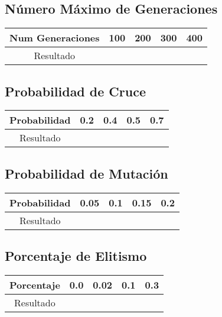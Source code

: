 \documentclass[12pt]{article}
\begin{document}
	

\subsection{Número Máximo de Generaciones}
\begin{table}[H]
\begin{center}
\begin{tabular}{|ccccc|} \hline
Num Generaciones  & 100 & 200 & 300 & 400 \\  \hline
Resultado  &   &  &  & \\ \hline
\end{tabular}
\end{center}
\end{table}	

	

\subsection{Probabilidad de Cruce}
\begin{table}[H]
\begin{center}
\begin{tabular}{|ccccc|} \hline
Probabilidad   & 0.2 & 0.4 & 0.5 & 0.7 \\  \hline
Resultado  &  &  &  &  \\ \hline
\end{tabular}
\end{center}
\end{table}

	

\subsection{Probabilidad de Mutación}
\begin{table}[H]
\begin{center}
\begin{tabular}{|ccccc|} \hline
Probabilidad   & 0.05 & 0.1 & 0.15 & 0.2 \\  \hline
Resultado  &   &  &  &  \\ \hline
\end{tabular}
\end{center}
\end{table}

	

\subsection{Porcentaje de Elitismo}
\begin{table}[H]
\begin{center}
\begin{tabular}{|ccccc|} \hline
Porcentaje   & 0.0 & 0.02 & 0.1 & 0.3 \\  \hline
Resultado  &  &  &  &  \\ \hline
\end{tabular}
\end{center}
\end{table}
\end{document}
